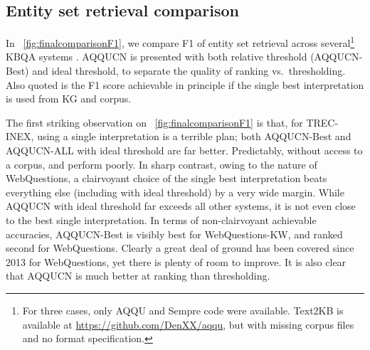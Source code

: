 \documentclass{svjour3}
\begin{document}
\subsection{Entity set retrieval comparison}
\label{sec:rankingToSet}

In \tablename~\ref{fig:finalcomparisonF1}, we compare F1 of entity set retrieval across several\footnote{For three cases, only AQQU \citep{BastH2015aqqu} and Sempre \citep{BerantL2015AgendaIL} code were available.  Text2KB is available at \protect\url{https://github.com/DenXX/aqqu}, but with missing corpus files and no format specification.} KBQA systems \citep{CodaLabWebQuestions}.  AQQUCN is presented with both relative threshold (AQQUCN-Best) and ideal threshold, to separate the quality of ranking vs.\ thresholding.  Also quoted is the F1 score achievable in principle if the single best interpretation is used from KG and corpus.

The first striking observation on \tablename~\ref{fig:finalcomparisonF1} is that, for TREC-INEX, using a single interpretation is a terrible plan; both AQQUCN-Best and AQQUCN-ALL with ideal threshold are far better.  Predictably, without access to a corpus, \citet{BerantL2015AgendaIL} and \citet{BastH2015aqqu} perform poorly.  In sharp contrast, owing to the nature of WebQuestions, a clairvoyant choice of the single best interpretation beats everything else (including \citet{SavenkovA2016KbCorpusQa} with ideal threshold) by a very wide margin.  While AQQUCN with ideal threshold far exceeds all other systems, it is not even close to the best single interpretation.  In terms of non-clairvoyant achievable accuracies, AQQUCN-Best is visibly best for WebQuestions-KW, and ranked second for WebQuestions.  Clearly a great deal of ground has been covered since 2013 for WebQuestions, yet there is plenty of room to improve.  It is also clear that AQQUCN is much better at ranking than thresholding.
\end{document}
